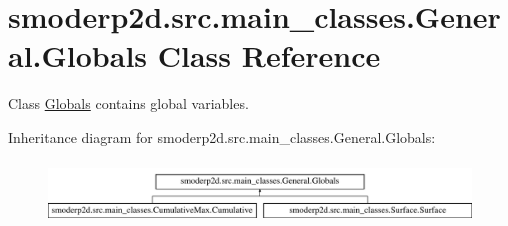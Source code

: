\hypertarget{classsmoderp2d_1_1src_1_1main__classes_1_1General_1_1Globals}{\section{smoderp2d.\-src.\-main\-\_\-classes.\-General.\-Globals Class Reference}
\label{classsmoderp2d_1_1src_1_1main__classes_1_1General_1_1Globals}
}


Class \hyperlink{classsmoderp2d_1_1src_1_1main__classes_1_1General_1_1Globals}{Globals} contains global variables.  


Inheritance diagram for smoderp2d.\-src.\-main\-\_\-classes.\-General.\-Globals\-:\begin{figure}[H]
\begin{center}
\leavevmode
\includegraphics[height=1.651917cm]{d7/d1c/classsmoderp2d_1_1src_1_1main__classes_1_1General_1_1Globals}
\end{center}
\end{figure}
